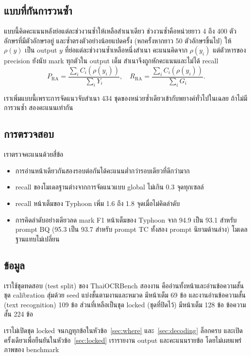 \subsection{แบบที่กันการวนซ้ำ}
แบบนี้คิดคะแนนหลังย่อแต่ละช่วงวนซ้ำให้เหลือสำเนาเดียว ช่วงวนซ้ำคือหน่วยยาว 4 ถึง 400 ตัวอักษรที่มีตัวอักษรอยู่ และซ้ำตรงตัวอย่างน้อยแปดครั้ง (หกครั้งหากยาว 50 ตัวอักษรขึ้นไป) ให้ $\rho(y)$ เป็น output $y$ ที่ย่อแต่ละช่วงวนซ้ำเหลือหนึ่งสำเนา คะแนนคิดจาก $\rho(y_i)$ แต่ตัวหารของ precision ยังนับ mark ทุกตัวใน output เต็ม สำเนาจึงถูกหักคะแนนและไม่ได้ recall
\begin{equation}
P_{\mathrm{RA}}=\frac{\sum_i C_i(\rho(y_i))}{\sum_i Y_i},\quad
R_{\mathrm{RA}}=\frac{\sum_i C_i(\rho(y_i))}{\sum_i G_i}.
\end{equation}

เราเพิ่มแบบนี้เพราะการจัดแนวจับสำเนา 434 ชุดของหน่วยซ้ำเดียวเข้ากับพยางค์ทั่วไปในเฉลย ถ้าไม่มีการวนซ้ำ สองคะแนนเท่ากัน

\subsection{การตรวจสอบ}
เราตรวจคะแนนด้วยสี่ข้อ
\begin{itemize}
\item การอ่านหน้าเดียวกันสองรอบต่อกันได้คะแนนต่ำกว่ารอบเดียวที่ดีกว่ามาก
\item recall ของโมเดลฐานต่างจากการจัดแนวแบบ global ไม่เกิน 0.3 จุดทุกเซลล์
\item recall หน้าเต็มของ Typhoon เพิ่ม 1.6 ถึง 1.8 จุดเมื่อไม่คิดลำดับ
\item การคิดลำดับอย่างเดียวลด mark F1 หน้าเต็มของ Typhoon จาก 94.9 เป็น 93.1 สำหรับ prompt BQ (95.3 เป็น 93.7 สำหรับ prompt TC ทั้งสอง prompt นิยามด้านล่าง) โมเดลฐานแทบไม่เปลี่ยน
\end{itemize}

\subsection{ข้อมูล}
เราใช้ชุดทดสอบ (test split) ของ ThaiOCRBench \cite{nonesung2025thaiocrbench} สองงาน คืออ่านทั้งหน้าและอ่านข้อความสั้น ชุด calibration สุ่มด้วย seed แบ่งชั้นตามงานและหมวด มีหน้าเต็ม 69 ข้อ และงานอ่านข้อความสั้น (text recognition) 109 ข้อ ส่วนที่เหลือเป็นชุด locked (ชุดที่ปิดไว้) มีหน้าเต็ม 128 ข้อ ข้อความสั้น 224 ข้อ

เราไม่เปิดชุด locked จนกฎทุกข้อในหัวข้อ~\ref{sec:where} และ~\ref{sec:decoding} ล็อกครบ และเปิดครั้งเดียวเพื่อยืนยันในหัวข้อ~\ref{sec:locked} เรารายงาน output และคะแนนรายข้อ โดยไม่เผยแพร่ภาพของ benchmark

